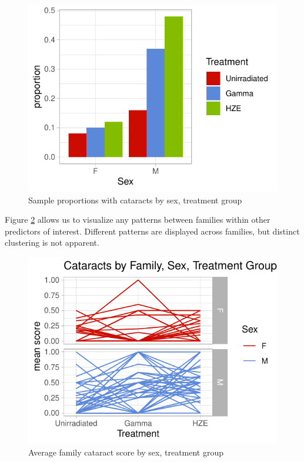\documentclass[12pt]{article}
\begin{document}
\begin{figure}[H]

{\centering \includegraphics{bookdown_report_files/figure-latex/bareda-1} 

}

\caption{Sample proportions with cataracts by sex, treatment group}\label{fig:bareda}
\end{figure}

Figure \ref{fig:lineeda} allows us to visualize any patterns between families within other predictors of interest. Different patterns are displayed across families, but distinct clustering is not apparent.\\

\begin{figure}[H]

\hfill{}\includegraphics{bookdown_report_files/figure-latex/lineeda-1} 

\caption{Average family cataract score by sex, treatment group}\label{fig:lineeda}
\end{figure}
\end{document}

